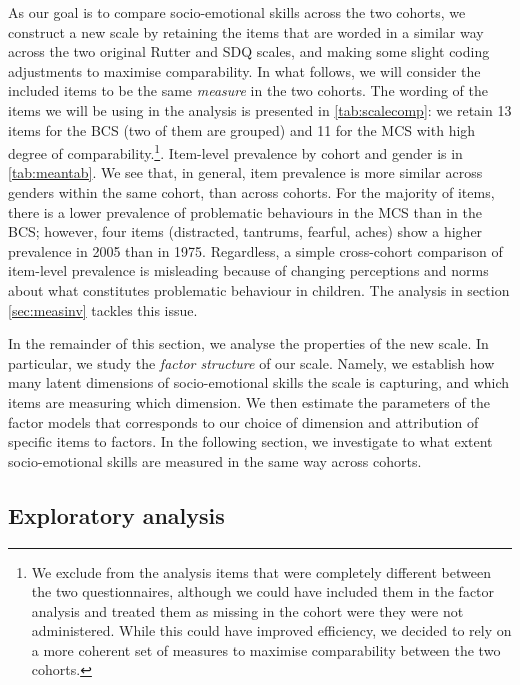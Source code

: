 As our goal is to compare socio-emotional skills across the two cohorts, we construct a new scale by retaining the items that are worded in a similar way across the two original Rutter and SDQ scales, and making some slight coding adjustments to maximise comparability. In what follows, we will consider the included items to be the same \emph{measure} in the two cohorts. The wording of the items we will be using in the analysis is presented in \autoref{tab:scalecomp}: we retain 13 items for the BCS (two of them are grouped) and 11 for the MCS with high degree of comparability.\footnote{We exclude from the analysis items that were completely different between the two questionnaires, although we could have included them in the factor analysis and treated them as missing in the cohort were they were not administered. While this could have improved efficiency, we decided to rely on a more coherent set of measures to maximise comparability between the two cohorts.}. Item-level prevalence by cohort and gender is in \autoref{tab:meantab}. We see that, in general, item prevalence is more similar across genders within the same cohort, than across cohorts. For the majority of items, there is a lower prevalence of problematic behaviours in the MCS than in the BCS; however, four items (distracted, tantrums, fearful, aches) show a higher prevalence in 2005 than in 1975. Regardless, a simple cross-cohort comparison of item-level prevalence is misleading because of changing perceptions and norms about what constitutes problematic behaviour in children. The analysis in section \ref{sec:measinv} tackles this issue.

In the remainder of this section, we analyse the properties of the new scale. In particular, we study the \emph{factor structure} of our scale. Namely, we establish how many latent dimensions of socio-emotional skills the scale is capturing, and which items are measuring which dimension. We then estimate the parameters of the factor models that corresponds to our choice of dimension and attribution of specific items to factors. In the following section, we investigate to what extent socio-emotional skills are measured in the same way across cohorts.

\subsection{Exploratory analysis \label{sec:ea}}

